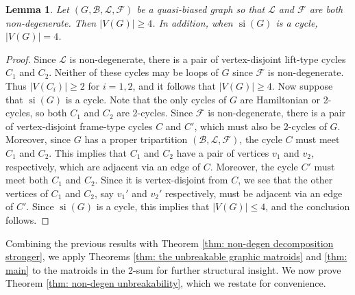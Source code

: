 \documentclass[12pt]{article}
\newtheorem{lemma}[theorem]{Lemma}
\theoremstyle{definition}
\theoremstyle{plain} %
\newcommand{\cB}{\mathcal{B}}
\newcommand{\cF}{\mathcal{F}}
\newcommand{\cL}{\mathcal{L}}
\DeclareMathOperator{\si}{si}
\newcommand{\qbg}{\ensuremath{(G,\cB,\cL,\cF)}}
\begin{document}
\begin{lemma}\label{lem: nondegen vertex bounds}
    Let $\qbg$ be a quasi-biased graph so that $\cL$ and $\cF$ are both non-degenerate. Then $\lvert V(G)\rvert\geq4$. In addition, when $\si(G)$ is a cycle, $\lvert V(G)\rvert=4$.
\end{lemma}
\begin{proof}
    Since $\cL$ is non-degenerate, there is a pair of vertex-disjoint lift-type cycles $C_1$ and $C_2$. Neither of these cycles may be loops of $G$ since $\cF$ is non-degenerate. Thus $\lvert V(C_i)\rvert\geq2$ for $i=1,2$, and it follows that $\lvert V(G)\rvert\geq4$. Now suppose that $\si(G)$ is a cycle. Note that the only cycles of $G$ are Hamiltonian or 2-cycles, so both $C_1$ and $C_2$ are 2-cycles. Since $\cF$ is non-degenerate, there is a pair of vertex-disjoint frame-type cycles $C$ and $C'$, which must also be 2-cycles of $G$. Moreover, since $G$ has a proper tripartition $(\cB,\cL,\cF)$, the cycle $C$ must meet $C_1$ and $C_2$. This implies that $C_1$ and $C_2$ have a pair of vertices $v_1$ and $v_2$, respectively, which are adjacent via an edge of $C$. Moreover, the cycle $C'$ must meet both $C_1$ and $C_2$. Since it is vertex-disjoint from $C$, we see that the other vertices of $C_1$ and $C_2$, say $v_1'$ and $v_2'$ respectively, must be adjacent via an edge of $C'$. Since $\si(G)$ is a cycle, this implies that $\lvert V(G)\rvert\leq4$, and the conclusion follows.
\end{proof}



Combining the previous results with Theorem \ref{thm: non-degen decomposition stronger}, we apply Theorems \ref{thm: the unbreakable graphic matroids} and \ref{thm: main} to the matroids in the 2-sum for further structural insight. We now prove Theorem \ref{thm: non-degen unbreakability}, which we restate for convenience.
\end{document}

